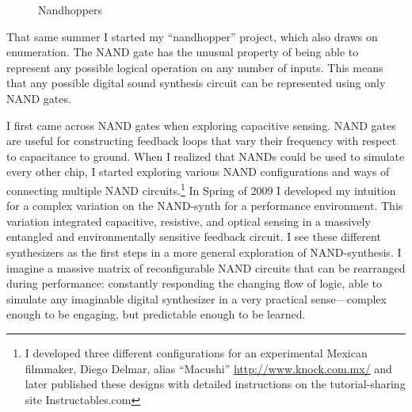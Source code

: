 \documentclass{thesis}
\begin{document}
\begin{figure}
\begin{center}
	  \caption{Nandhoppers}
	  \label{nandhoppers}
  \end{center}
\end{figure}

That same summer I started my ``nandhopper'' project\cite{kyle_mcdonald_nandhopper_2008}, which also draws on enumeration. The NAND gate has the unusual property of being able to represent any possible logical operation on any number of inputs. This means that any possible digital sound synthesis circuit can be represented using only NAND gates.
	
I first came across NAND gates when exploring capacitive sensing. NAND gates are useful for constructing feedback loops that vary their frequency with respect to capacitance to ground. When I realized that NANDs could be used to simulate every other chip, I started exploring various NAND configurations and ways of connecting multiple NAND circuits.\footnote{I developed three different configurations for an experimental Mexican filmmaker, Diego Delmar, alias ``Macushi'' \url{http://www.knock.com.mx/} and later published these designs with detailed instructions on the tutorial-sharing site Instructables.com} In Spring of 2009 I developed my intuition for a complex variation on the NAND-synth for a performance environment. This variation integrated capacitive, resistive, and optical sensing in a massively entangled and environmentally sensitive feedback circuit. I see these different synthesizers as the first steps in a more general exploration of NAND-synthesis. I imagine a massive matrix of reconfigurable NAND circuits that can be rearranged during performance: constantly responding the changing flow of logic, able to simulate any imaginable digital synthesizer in a very practical sense---complex enough to be engaging, but predictable enough to be learned.
\end{document}
